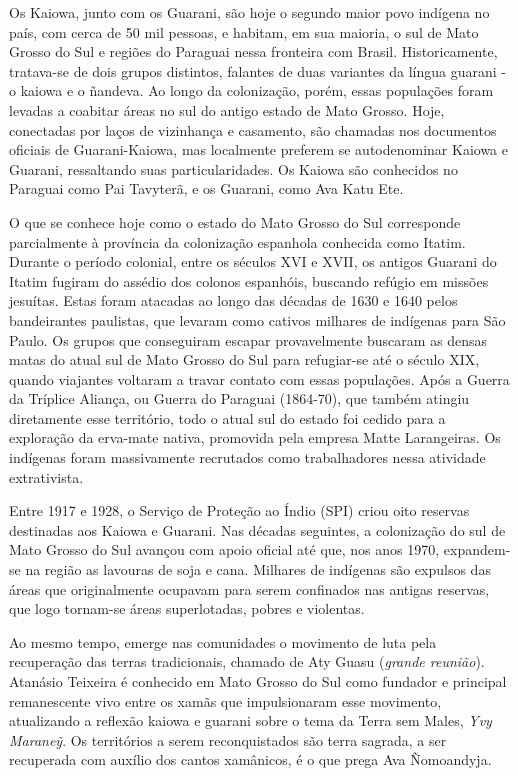 Os Kaiowa, junto com os Guarani, são hoje o segundo maior povo indígena
no país, com cerca de 50 mil pessoas, e habitam, em sua maioria, o sul
de Mato Grosso do Sul e regiões do Paraguai nessa fronteira com Brasil.
Historicamente, tratava-se de dois grupos distintos, falantes de duas
variantes da língua guarani - o kaiowa e o ñandeva. Ao longo da
colonização, porém, essas populações foram levadas a coabitar áreas no
sul do antigo estado de Mato Grosso. Hoje, conectadas por laços de
vizinhança e casamento, são chamadas nos documentos oficiais de
Guarani-Kaiowa, mas localmente preferem se autodenominar Kaiowa e
Guarani, ressaltando suas particularidades. Os Kaiowa são conhecidos no
Paraguai como Pai Tavyterã, e os Guarani, como Ava Katu Ete.

O que se conhece hoje como o estado do Mato Grosso do Sul corresponde
parcialmente à província da colonização espanhola conhecida como Itatim.
Durante o período colonial, entre os séculos XVI e XVII, os antigos
Guarani do Itatim fugiram do assédio dos colonos espanhóis, buscando
refúgio em missões jesuítas. Estas foram atacadas ao longo das décadas
de 1630 e 1640 pelos bandeirantes paulistas, que levaram como cativos
milhares de indígenas para São Paulo. Os grupos que conseguiram escapar
provavelmente buscaram as densas matas do atual sul de Mato Grosso do
Sul para refugiar-se até o século XIX, quando viajantes voltaram a
travar contato com essas populações. Após a Guerra da Tríplice Aliança,
ou Guerra do Paraguai (1864-70), que também atingiu diretamente esse
território, todo o atual sul do estado foi cedido para a exploração da
erva-mate nativa, promovida pela empresa Matte Larangeiras. Os indígenas
foram massivamente recrutados como trabalhadores nessa atividade
extrativista.

Entre 1917 e 1928, o Serviço de Proteção ao Índio (SPI) criou oito
reservas destinadas aos Kaiowa e Guarani. Nas décadas seguintes, a
colonização do sul de Mato Grosso do Sul avançou com apoio oficial até
que, nos anos 1970, expandem-se na região as lavouras de soja e cana.
Milhares de indígenas são expulsos das áreas que originalmente ocupavam
para serem confinados nas antigas reservas, que logo tornam-se áreas
superlotadas, pobres e violentas.

Ao mesmo tempo, emerge nas comunidades o movimento de luta pela
recuperação das terras tradicionais, chamado de Aty Guasu (\emph{grande
reunião}). Atanásio Teixeira é conhecido em Mato Grosso do Sul como
fundador e principal remanescente vivo entre os xamãs que impulsionaram
esse movimento, atualizando a reflexão kaiowa e guarani sobre o tema da
Terra sem Males, \emph{Yvy Maraneỹ}. Os territórios a serem
reconquistados são terra sagrada, a ser recuperada com auxílio dos
cantos xamânicos, é o que prega Ava Ñomoandyja.


